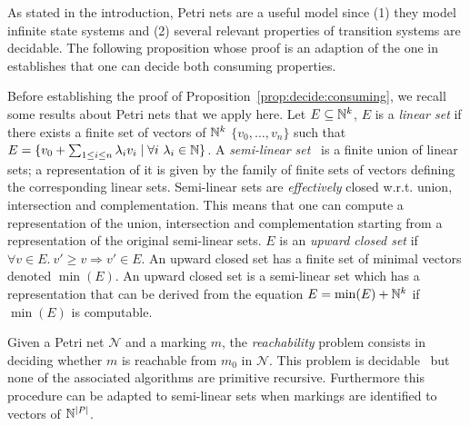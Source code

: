 
As stated in the introduction, Petri nets are a useful model since (1) they 
model infinite state systems and (2) several relevant properties of transition
systems are decidable. The following proposition whose proof is an %
adaption of the one in~\cite{haddad-et-al-2013} establishes that 
one can decide both consuming properties. 

Before establishing the proof of Proposition~\ref{prop:decide:consuming},
we recall some results about Petri nets that we apply here.
Let $E \subseteq \mathbb{N}^k$, $E$ is a \emph{linear set}
if there exists a finite set of vectors of $\mathbb{N}^k$ $\{v_0,\ldots,v_n\}$
such that $E=\{v_0 + \sum_{1 \leq i \leq n} \lambda_i v_i\mid \forall i\ \lambda_i \in \mathbb{N}\}$.
A \emph{semi-linear set}~\cite{gs66} is a finite union of linear sets; a representation of it is given
by the family of finite sets of vectors defining the corresponding linear sets.
Semi-linear sets are \emph{effectively} closed w.r.t. union, intersection and complementation.
This means that one can compute a representation of the union, intersection and complementation
starting from a representation of the original semi-linear sets. 
$E$ is an \emph{upward closed set} if $\forall v \in E.\ v'\geq v \Rightarrow v' \in E$.
An upward closed set has a finite set of minimal vectors denoted $\min(E)$. 
An upward closed set is a semi-linear set which has a representation that can be derived
from the equation $E=\min(E)+\mathbb{N}^k$ if $\min(E)$ is computable.

Given a Petri net $\mathcal N$  and a marking $m$, the \emph{reachability}
problem consists in deciding whether $m$ is reachable from $m_0$
in $\mathcal N$. This problem is decidable~\cite{ReachaPbMayer}
but none of the associated algorithms are primitive recursive. 
Furthermore this procedure can be adapted to semi-linear sets
when markings are identified to vectors of $\mathbb{N}^{|P|}$.

